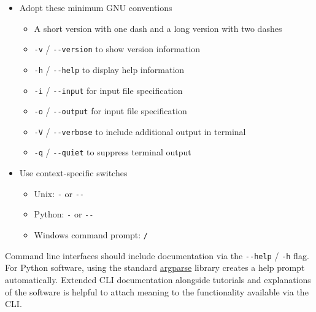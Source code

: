 \documentclass[]{nlr}
\begin{document}
\begin{itemize}
\begin{itemize}
\item Guideline 12: The order of operands may matter and position-related interpretations should be determined on a utility-specific basis.
\item Guideline 13: For utilities that use operands to represent files to be opened for either reading or writing, the \lstinline{-} operand should be used to mean only standard input (or standard output when it is clear from context that an output file is being specified) or a file named "-".
\item Guideline 14: If an argument can be identified according to Guidelines 3 through 10 as an option, or as a group of options without option-arguments behind one \lstinline{-} delimiter, then it should be treated as such.
\end{itemize}

\item Adopt these minimum GNU conventions
\begin{itemize}
\item A short version with one dash and a long version with two dashes
\item \lstinline{-v} / \lstinline{--version} to show version information
\item \lstinline{-h} / \lstinline{--help} to display help information
\item \lstinline{-i} / \lstinline{--input} for input file specification
\item \lstinline{-o} / \lstinline{--output} for input file specification
\item \lstinline{-V} / \lstinline{--verbose} to include additional output in terminal
\item \lstinline{-q} / \lstinline{--quiet} to suppress terminal output
\end{itemize}

\item Use context-specific switches
\begin{itemize}
\item Unix: \lstinline{-} or \lstinline{--}
\item Python: \lstinline{-} or \lstinline{--}
\item Windows command prompt: \lstinline{/}
\end{itemize}

\end{itemize}

Command line interfaces should include documentation via the \lstinline{--help} / \lstinline{-h} flag.
For Python software, using the standard \href{https://docs.python.org/3/library/argparse.html}{argparse}
library creates a help prompt automatically.
Extended CLI documentation alongside tutorials and explanations of the software is helpful to
attach meaning to the functionality available via the CLI.
\end{document}
